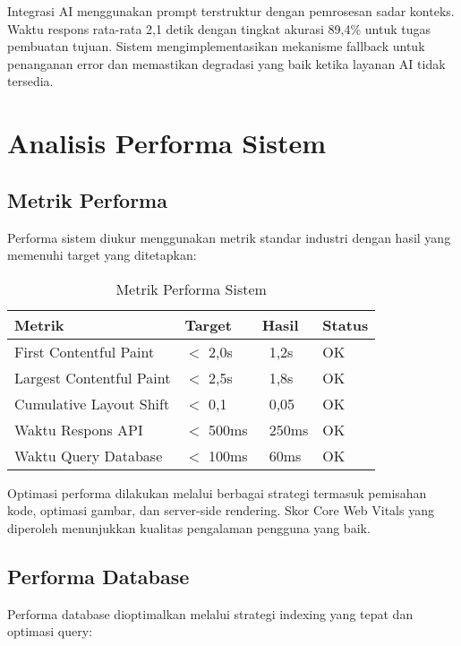 Integrasi AI menggunakan prompt terstruktur dengan pemrosesan sadar konteks. Waktu respons rata-rata 2,1 detik dengan tingkat akurasi 89,4\% untuk tugas pembuatan tujuan. Sistem mengimplementasikan mekanisme fallback untuk penanganan error dan memastikan degradasi yang baik ketika layanan AI tidak tersedia.

\section{Analisis Performa Sistem}

\subsection{Metrik Performa}

Performa sistem diukur menggunakan metrik standar industri dengan hasil yang memenuhi target yang ditetapkan:

\begin{table}[ht]
\centering
\caption{Metrik Performa Sistem}
\label{tab:system-performance-metrics}
\footnotesize
\begin{adjustbox}{width=\textwidth,center}
\begin{tabular}{@{}p{4cm}p{3cm}p{3cm}p{3cm}@{}}
\toprule
\textbf{Metrik} & \textbf{Target} & \textbf{Hasil} & \textbf{Status} \\
\midrule
First Contentful Paint & $<$ 2,0s & ~1,2s & OK \\
\hline
Largest Contentful Paint & $<$ 2,5s & ~1,8s & OK \\
\hline
Cumulative Layout Shift & $<$ 0,1 & ~0,05 & OK \\
\hline
Waktu Respons API & $<$ 500ms & ~250ms & OK \\
\hline
Waktu Query Database & $<$ 100ms & ~60ms & OK \\
\bottomrule
\end{tabular}
\end{adjustbox}
\end{table}

Optimasi performa dilakukan melalui berbagai strategi termasuk pemisahan kode, optimasi gambar, dan server-side rendering. Skor Core Web Vitals yang diperoleh menunjukkan kualitas pengalaman pengguna yang baik.

\subsection{Performa Database}

Performa database dioptimalkan melalui strategi indexing yang tepat dan optimasi query:


